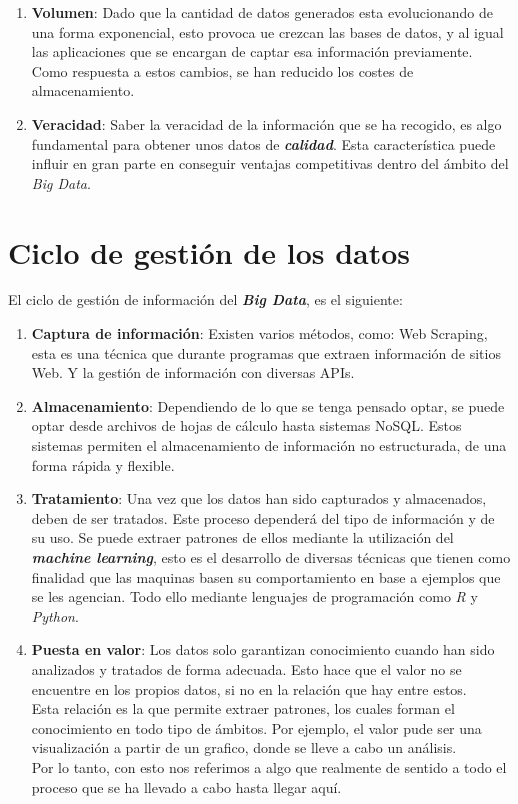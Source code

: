 \documentclass[11pt]{diazessay} %
\begin{document}
\begin{enumerate}
	\item \textbf{Volumen}: Dado que la cantidad de datos generados esta evolucionando de una forma exponencial, esto provoca ue crezcan las bases de datos, y al igual las aplicaciones que se encargan de captar esa información previamente. Como respuesta a estos cambios, se han reducido los costes de almacenamiento.
	
	\item \textbf{Veracidad}: Saber la veracidad de la información que se ha recogido, es algo fundamental para obtener unos datos de \textit{\textbf{calidad}}.  Esta característica puede influir en gran parte en conseguir ventajas competitivas dentro del ámbito del \textit{Big Data}.
\end{enumerate}


\newpage
\section*{Ciclo de gestión de los datos}
El ciclo de gestión de información del \textit{\textbf{Big Data}}, es el siguiente:

\begin{enumerate}
	\item \textbf{Captura de información}: Existen varios métodos, como: Web Scraping, esta es una técnica que durante programas que extraen información de sitios Web. Y la gestión de información con diversas APIs.
	
	\item \textbf{Almacenamiento}: Dependiendo de lo que se tenga pensado optar, se puede optar desde archivos de hojas de cálculo hasta sistemas NoSQL. Estos sistemas permiten el almacenamiento de información no estructurada, de una forma rápida y flexible.
	
	\item \textbf{Tratamiento}: Una vez que los datos han sido capturados y almacenados, deben de ser tratados. Este proceso dependerá del tipo de información y de su uso. Se puede extraer patrones de ellos mediante la utilización del \textit{\textbf{machine learning}}, esto es el desarrollo de diversas técnicas que tienen como finalidad que las maquinas basen su comportamiento en base a ejemplos que se les agencian. Todo ello mediante lenguajes de programación como \textit{R} y \textit{Python}.
	
	\item \textbf{Puesta en valor}: Los datos solo garantizan conocimiento cuando han sido analizados y tratados de forma adecuada. Esto hace que el valor no se encuentre en los propios datos, si no en la relación que hay entre estos.\\
	Esta relación es la que permite extraer patrones, los cuales forman el conocimiento en todo tipo de ámbitos. Por ejemplo, el valor pude ser una visualización a partir de un grafico, donde se lleve a cabo un análisis.\\
	Por lo tanto, con esto nos referimos a algo que realmente de sentido a todo el proceso que se ha llevado a cabo hasta llegar aquí.
\end{enumerate}
\end{document}
